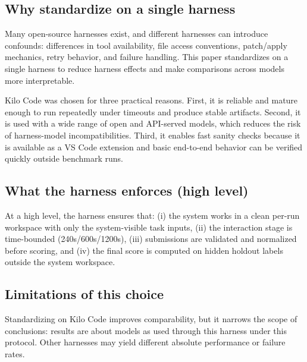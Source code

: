 \subsection{Why standardize on a single harness}
Many open-source harnesses exist, and different harnesses can introduce confounds: differences in tool availability, file access conventions, patch/apply mechanics, retry behavior, and failure handling. This paper standardizes on a single harness to reduce harness effects and make comparisons across models more interpretable.

Kilo Code was chosen for three practical reasons. First, it is reliable and mature enough to run repeatedly under timeouts and produce stable artifacts. Second, it is used with a wide range of open and API-served models, which reduces the risk of harness-model incompatibilities. Third, it enables fast sanity checks because it is available as a VS Code extension and basic end-to-end behavior can be verified quickly outside benchmark runs.

\subsection{What the harness enforces (high level)}
At a high level, the harness ensures that: (i) the system works in a clean per-run workspace with only the system-visible task inputs, (ii) the interaction stage is time-bounded (240s/600s/1200s), (iii) submissions are validated and normalized before scoring, and (iv) the final score is computed on hidden holdout labels outside the system workspace.

\subsection{Limitations of this choice}
Standardizing on Kilo Code improves comparability, but it narrows the scope of conclusions: results are about models as used through this harness under this protocol. Other harnesses may yield different absolute performance or failure rates.


